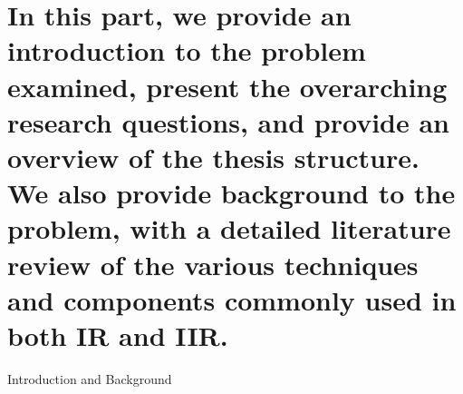 
\part[Introduction and Background]{In this part, we provide an introduction to the problem examined, present the overarching research questions, and provide an overview of the thesis structure. We also provide background to the problem, with a detailed literature review of the various techniques and components commonly used in both IR and IIR.}{Introduction and Background}
\label{part:intro}